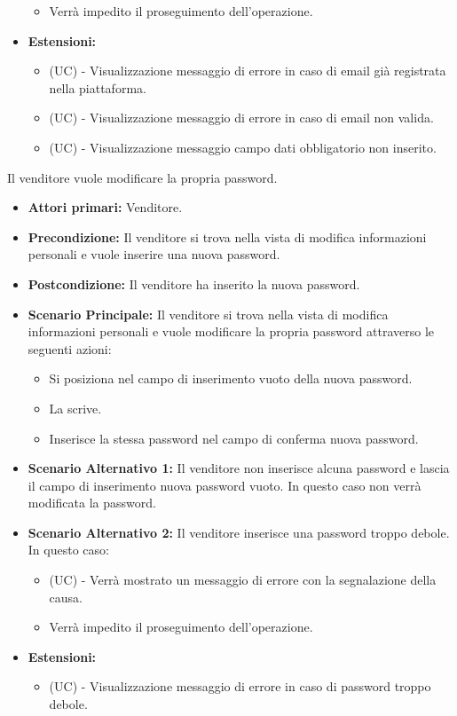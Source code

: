 \begin{itemize}
\begin{itemize}
        \item Verrà impedito il proseguimento dell'operazione.
    \end{itemize}
    \item \textbf{Estensioni:}
    \begin{itemize}
        \item (UC) - Visualizzazione messaggio di errore in caso di email già registrata nella piattaforma.
        \item (UC) - Visualizzazione messaggio di errore in caso di email non valida.
        \item (UC) - Visualizzazione messaggio campo dati obbligatorio non inserito.
    \end{itemize}
\end{itemize}

Il venditore vuole modificare la propria password.
\begin{itemize}
    \item \textbf{Attori primari:} Venditore.
    \item \textbf{Precondizione:} Il venditore si trova nella vista di modifica informazioni personali e vuole inserire una nuova password.
    \item \textbf{Postcondizione:} Il venditore ha inserito la nuova password.
    \item \textbf{Scenario Principale:} Il venditore si trova nella vista di modifica informazioni personali e vuole modificare la propria password attraverso le seguenti azioni:
        \begin{itemize}
            \item Si posiziona nel campo di inserimento vuoto della nuova password.
            \item La scrive.
            \item Inserisce la stessa password nel campo di conferma nuova password.
        \end{itemize}
    \item \textbf{Scenario Alternativo 1:} Il venditore non inserisce alcuna password e lascia il campo di inserimento nuova password vuoto. In questo caso non verrà modificata la password.
    \item \textbf{Scenario Alternativo 2:} Il venditore inserisce una password troppo debole. In questo caso:
    \begin{itemize}
        \item (UC) - Verrà mostrato un messaggio di errore con la segnalazione della causa.
        \item Verrà impedito il proseguimento dell'operazione.
    \end{itemize}
    \item \textbf{Estensioni:}
    \begin{itemize}
        \item (UC) - Visualizzazione messaggio di errore in caso di password troppo debole.
    \end{itemize}
\end{itemize}

